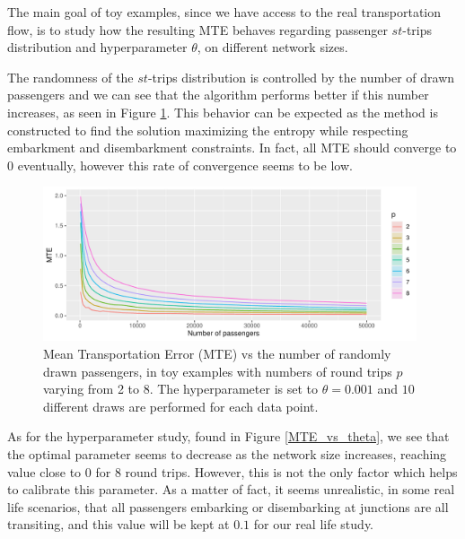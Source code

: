\documentclass{bmcart}
\begin{document}
The main goal of toy examples, since we have access to the real transportation flow, is to study how the resulting MTE behaves regarding passenger $st$-trips distribution and hyperparameter $\theta$, on different network sizes. 

The randomness of the $st$-trips distribution is controlled by the number of drawn passengers and we can see that the algorithm performs better if this number increases, as seen in Figure \ref{MTE_vs_passengers}. This behavior can be expected as the method is constructed to find the solution maximizing the entropy while respecting embarkment and disembarkment constraints. In fact, all MTE should converge to $0$ eventually, however this rate of convergence seems to be low.
\begin{figure}[h]
	\includegraphics[width=0.98\textwidth]{fig/MTE_passengers.pdf}
	\caption{Mean Transportation Error (MTE) vs the number of randomly drawn passengers, in toy examples with numbers of round trips $p$ varying from 2 to 8. The hyperparameter is set to $\theta=0.001$ and $10$ different draws are performed for each data point.}
	\label{MTE_vs_passengers}
\end{figure}
As for the hyperparameter study, found in Figure \ref{MTE_vs_theta}, we see that the optimal parameter seems to decrease as the network size increases, reaching value close to $0$ for $8$ round trips. However, this is not the only factor which helps to calibrate this parameter. As a matter of fact, it seems unrealistic, in some real life scenarios, that all passengers embarking or disembarking at junctions are all transiting, and this value will be kept at $0.1$ for our real life study.
\end{document}
